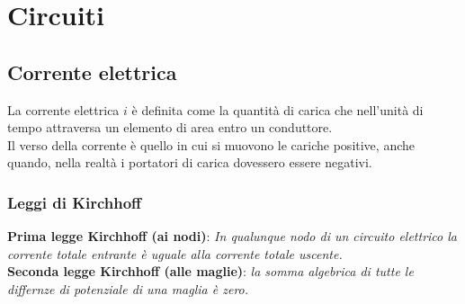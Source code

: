 \chapter{Circuiti}

\section{Corrente elettrica}
La corrente elettrica $i$ è definita come la quantità di carica che nell'unità di tempo attraversa un elemento di area entro un conduttore.\\
Il verso della corrente è quello in cui si muovono le cariche positive, anche quando, nella realtà i portatori di carica dovessero essere negativi.

\subsection{Leggi di Kirchhoff}
\textbf{Prima legge Kirchhoff (ai nodi)}: \textit{In qualunque nodo di un circuito elettrico la corrente totale entrante è uguale alla corrente totale uscente.}\\
\textbf{Seconda legge Kirchhoff (alle maglie)}: \textit{la somma algebrica di tutte le differnze di potenziale di una maglia è zero.}

